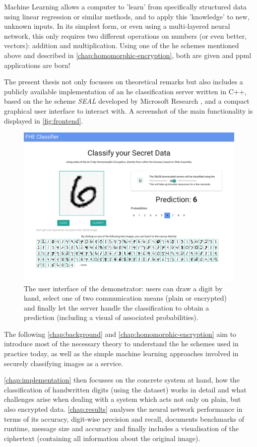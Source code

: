 Machine Learning allows a computer to 'learn' from specifically structured data using linear regression or similar methods, and to apply this 'knowledge' to new, unknown inputs.
In its simplest form, or even using a multi-layered neural network, this only requires two different operations on numbers (or even better, vectors): addition and multiplication.
Using one of the \gls{he} schemes mentioned above and described in \autoref{chap:homomorphic-encryption}, both are given and \gls{ppml} applications are born!

The present thesis not only focusses on theoretical remarks but also includes a publicly available implementation of an \gls{he} classification server written in C++, based on the \glsdesc{he} scheme \textit{SEAL} developed by Microsoft Research \parencite{seal-4.0}, and a compact graphical user interface to interact with.
A screenshot of the main functionality is displayed in \autoref{fig:frontend}.

\begin{figure}[H]
  \centering
  \includegraphics[width=\linewidth]{figures/frontend.pdf}
  \vspace{-1.2cm}
  \caption[User interface of the demonstrator]{The user interface of the demonstrator: users can draw a digit by hand, select one of two communication means (plain or encrypted) and finally let the server handle the classification to obtain a prediction (including a visual of associated probabilities).}
  \label{fig:frontend}
\end{figure}

The following \autoref{chap:background} and \autoref{chap:homomorphic-encryption} aim to introduce most of the necessary theory to understand the \gls{he} schemes used in practice today, as well as the simple machine learning approaches involved in securely classifying images as a service.

\autoref{chap:implementation} then focusses on the concrete system at hand, how the classification of handwritten digits (using the  dataset) works in detail and what challenges arise when dealing with a system which acts not only on plain, but also encrypted data.
\autoref{chap:results} analyses the neural network performance in terms of its accuracy, digit-wise precision and recall, documents benchmarks of runtime, message size and accuracy and finally includes a visualisation of the ciphertext (containing all information about the original image).
